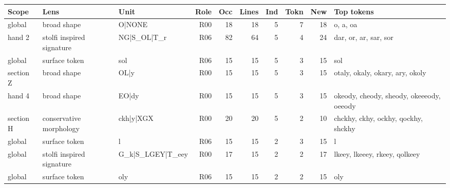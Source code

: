 \begin{tabular}{lllrrrrrrl}
\toprule
Scope & Lens & Unit & Role & Occ & Lines & Ind & Tokn & New & Top tokens \\
\midrule
global & broad shape & O|NONE & R00 & 18 & 18 & 5 & 7 & 18 & o, a, oa \\
hand 2 & stolfi inspired signature & NG|S\_OL|T\_r & R06 & 82 & 64 & 5 & 4 & 24 & dar, or, ar, sar, sor \\
global & surface token & sol & R06 & 15 & 15 & 5 & 3 & 15 & sol \\
section Z & broad shape & OL|y & R00 & 15 & 15 & 5 & 3 & 15 & otaly, okaly, okary, ary, okoly \\
hand 4 & broad shape & EO|dy & R00 & 15 & 15 & 5 & 3 & 15 & okeody, cheody, sheody, okeeeody, oeeody \\
section H & conservative morphology & ckh|y|XGX & R00 & 20 & 20 & 5 & 2 & 10 & chckhy, ckhy, ockhy, qockhy, shckhy \\
global & surface token & l & R06 & 15 & 15 & 2 & 3 & 15 & l \\
global & stolfi inspired signature & G\_k|S\_LGEY|T\_eey & R00 & 17 & 15 & 2 & 2 & 17 & lkeey, lkeeey, rkeey, qolkeey \\
global & surface token & oly & R06 & 15 & 15 & 2 & 2 & 15 & oly \\
\bottomrule
\end{tabular}